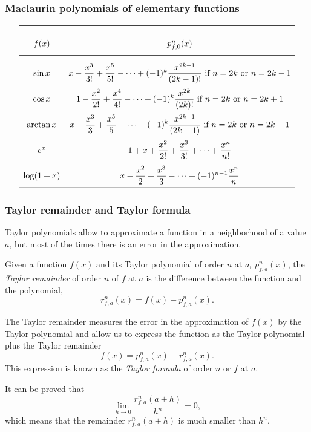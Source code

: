 \begin{frame}
\frametitle{Maclaurin polynomials of elementary functions}
\[
\renewcommand{\arraystretch}{2.5}
\begin{array}{cc}
\toprule
f(x) & p_{f,0}^n(x) \\
\midrule
\sin x & \displaystyle x - \frac{x^3}{3!} + \frac{x^5}{5!} - \cdots + (-1)^k\frac{x^{2k-1}}{(2k-1)!} \mbox{ if $n=2k$ or $n=2k-1$}\\
\cos x &  \displaystyle 1 - \frac{x^2}{2!} + \frac{x^4}{4!} - \cdots + (-1)^k\frac{x^{2k}}{(2k)!} \mbox{ if $n=2k$ or $n=2k+1$}\\
\arctan x &  \displaystyle x - \frac{x^3}{3} + \frac{x^5}{5} - \cdots + (-1)^k\frac{x^{2k-1}}{(2k-1)} \mbox{ if $n=2k$ or $n=2k-1$}\\
e^x & \displaystyle 1 + x + \frac{x^2}{2!} + \frac{x^3}{3!} + \cdots + \frac{x^n}{n!}\\
\log(1+x) & \displaystyle x - \frac{x^2}{2} + \frac{x^3}{3} - \cdots + (-1)^{n-1}\frac{x^n}{n}\\
\bottomrule
\end{array}
\]
\end{frame}


\begin{frame}
\frametitle{Taylor remainder and Taylor formula}
Taylor polynomials allow to approximate a function in a neighborhood of a value $a$, but most of the times there is an error in the approximation.
\begin{definition}
Given a function  $f(x)$ and its Taylor polynomial of order $n$ at $a$, $p_{f,a}^n(x)$, the \emph{Taylor remainder} of order $n$ of $f$ at $a$ is the difference between the function and the polynomial,
\[
r_{f,a}^n(x)=f(x)-p_{f,a}^n(x).
\]
\end{definition}

The Taylor remainder measures the error in the approximation of $f(x)$ by the Taylor polynomial and allow us to express the function as the Taylor polynomial plus the Taylor remainder
\[
f(x)=p_{f,a}^n(x) + r_{f,a}^n(x).
\]
This expression is known as the \emph{Taylor formula} of order $n$ or $f$ at $a$. 

It can be proved that
\[
\lim_{h\rightarrow 0}\frac{r_{f,a}^n(a+h)}{h^n}=0,
\]
which means that the remainder $r_{f,a}^n(a+h)$ is much smaller than $h^n$.
\end{frame}


